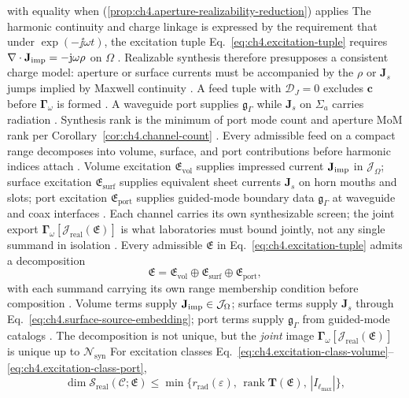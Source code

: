 with equality when (\ref{prop:ch4.aperture-realizability-reduction}) applies
The harmonic continuity and charge linkage is expressed by the requirement that under \(\exp(-\jj\omega t)\), the excitation tuple Eq.~\eqref{eq:ch4.excitation-tuple} requires
\(\nabla\cdot\mathbf{J}_{\mathrm{imp}}=-\mathrm{j}\omega\rho\) on \(\Omega\) . Realizable synthesis therefore presupposes a
consistent charge model: aperture or surface currents must be accompanied by the \(\rho\) or \(\mathbf{J}_{s}\) jumps
implied by Maxwell continuity . A feed tuple with \(\mathcal{D}_{J}=0\) excludes
\(\mathbf{c}\) before \(\boldsymbol{\Gamma}_\omega\) is formed .
A waveguide port supplies \(\mathfrak{g}_\Gamma\) while \(\mathbf{J}_{s}\) on \(\Sigma_{a}\) carries radiation
. Synthesis rank is the minimum of port mode count and aperture MoM rank per
Corollary~\ref{cor:ch4.channel-count} .
Every admissible feed on a compact range decomposes into volume, surface, and port contributions before harmonic indices attach . Volume excitation $\mathfrak{E}_{\mathrm{vol}}$ supplies impressed current $\mathbf{J}_{\mathrm{imp}}$ in $\mathcal{J}_\Omega$; surface excitation $\mathfrak{E}_{\mathrm{surf}}$ supplies equivalent sheet currents $\mathbf{J}_s$ on horn mouths and slots; port excitation $\mathfrak{E}_{\mathrm{port}}$ supplies guided-mode boundary data $\mathfrak{g}_\Gamma$ at waveguide and coax interfaces . Each channel carries its own synthesizable screen; the joint export $\boldsymbol{\Gamma}_\omega[\mathcal{J}_{\mathrm{real}}(\mathfrak{E})]$ is what laboratories must bound jointly, not any single summand in isolation .
Every admissible \(\mathfrak{E}\) in Eq.~\eqref{eq:ch4.excitation-tuple} admits a decomposition
\begin{equation}
\label{eq:ch4.excitation-decomposition}
\mathfrak{E}
=
\mathfrak{E}_{\mathrm{vol}}
\oplus
\mathfrak{E}_{\mathrm{surf}}
\oplus
\mathfrak{E}_{\mathrm{port}},
\end{equation}
with each summand carrying its own range membership condition before composition .
Volume terms supply \(\mathbf{J}_{\mathrm{imp}}\in\mathcal{J}_\Omega\); surface terms supply \(\mathbf{J}_{s}\) through
Eq.~\eqref{eq:ch4.surface-source-embedding}; port terms supply \(\mathfrak{g}_\Gamma\) from guided-mode catalogs
. The decomposition is not unique, but the \emph{joint} image
\(\boldsymbol{\Gamma}_\omega[\mathcal{J}_{\mathrm{real}}(\mathfrak{E})]\) is unique up to \(\mathcal{N}_{\mathrm{syn}}\)
\label{thm:ch4.excitation-class-bound}
For excitation classes Eq.~\eqref{eq:ch4.excitation-class-volume}--\eqref{eq:ch4.excitation-class-port},
\begin{equation}
\label{eq:ch4.excitation-class-rank}
\dim\mathcal{S}_{\mathrm{real}}(\mathcal{C};\mathfrak{E})
\le
\min\big\{
r_{\mathrm{rad}}(\varepsilon),\,
\operatorname{rank}\mathbf{T}(\mathfrak{E}),\,
|I_{\ell_{\max}}|
\big\},
\end{equation}
